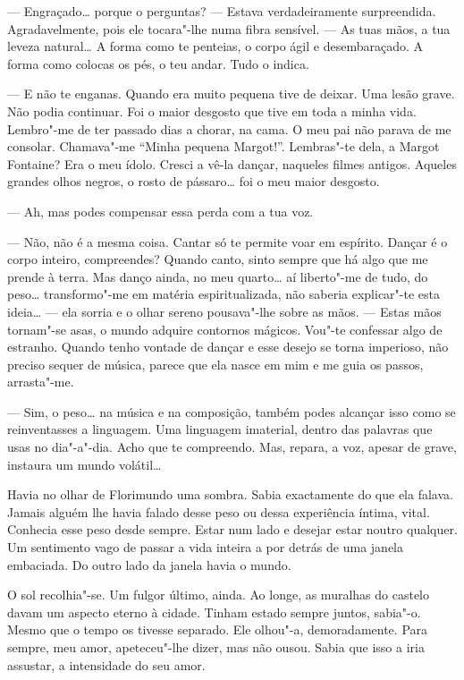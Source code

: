--- Engraçado\ldots{} porque o perguntas? --- Estava verdadeiramente surpreendida.
Agradavelmente, pois ele tocara"-lhe numa fibra sensível. --- As tuas mãos,
a tua leveza natural\ldots{} A forma como te penteias, o corpo ágil e
desembaraçado. A forma como colocas os pés, o teu andar. Tudo o indica.

--- E não te enganas. Quando era muito pequena tive de deixar. Uma lesão
grave. Não podia continuar. Foi o maior desgosto que tive em toda a
minha vida. Lembro"-me de ter passado dias a chorar, na cama. O meu pai
não parava de me consolar. Chamava"-me ``Minha pequena Margot!''.
Lembras"-te dela, a Margot Fontaine? Era o meu ídolo. Cresci a vê-la
dançar, naqueles filmes antigos. Aqueles grandes olhos negros, o rosto
de pássaro\ldots{} foi o meu maior desgosto.

--- Ah, mas podes compensar essa perda com a tua voz.

--- Não, não é a mesma coisa. Cantar só te permite voar em espírito.
Dançar é o corpo inteiro, compreendes? Quando canto, sinto sempre que há
algo que me prende à terra. Mas danço ainda, no meu quarto\ldots{} aí
liberto"-me de tudo, do peso\ldots{} transformo"-me em matéria espiritualizada,
não saberia explicar"-te esta ideia\ldots{} --- ela sorria e o olhar sereno
pousava"-lhe sobre as mãos. --- Estas mãos tornam"-se asas, o mundo adquire
contornos mágicos. Vou"-te confessar algo de estranho. Quando tenho
vontade de dançar e esse desejo se torna imperioso, não preciso sequer
de música, parece que ela nasce em mim e me guia os passos, arrasta"-me.

--- Sim, o peso\ldots{} na música e na composição, também podes alcançar isso
como se reinventasses a linguagem. Uma linguagem imaterial, dentro das
palavras que usas no dia"-a"-dia. Acho que te compreendo. Mas, repara, a
voz, apesar de grave, instaura um mundo volátil\ldots{}

Havia no olhar de Florimundo uma sombra. Sabia exactamente do que ela
falava. Jamais alguém lhe havia falado desse peso ou dessa experiência
íntima, vital. Conhecia esse peso desde sempre. Estar num lado e desejar
estar noutro qualquer. Um sentimento vago de passar a vida inteira a por
detrás de uma janela embaciada. Do outro lado da janela havia o mundo.

O sol recolhia"-se. Um fulgor último, ainda. Ao longe, as muralhas do
castelo davam um aspecto eterno à cidade. Tinham estado sempre juntos,
sabia"-o. Mesmo que o tempo os tivesse separado. Ele olhou"-a,
demoradamente. Para sempre, meu amor, apeteceu"-lhe dizer, mas não ousou.
Sabia que isso a iria assustar, a intensidade do seu amor.

